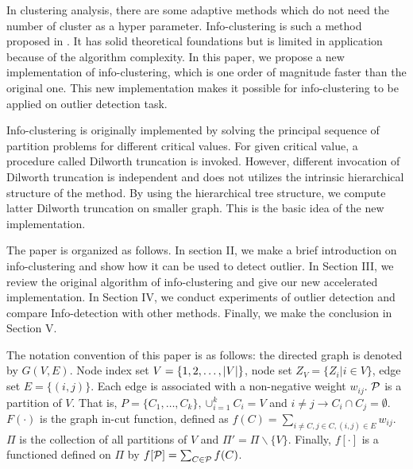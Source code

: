 \documentclass[runningheads]{llncs}
\begin{document}
In clustering analysis, there are some adaptive methods which do not need the number of cluster as a hyper parameter. Info-clustering is such a method proposed in \cite{RN1}. It has solid theoretical foundations but is limited in application because of the algorithm complexity. In this paper, we propose a new implementation of info-clustering, which is one order of magnitude faster than the original one. This new implementation makes it possible for info-clustering to be applied on outlier detection task. 

Info-clustering is originally implemented by solving the principal sequence of partition problems for different critical values. For given critical value, a procedure called Dilworth truncation is invoked. However, different invocation of Dilworth truncation is independent and does not utilizes the intrinsic hierarchical structure of the method. By using the hierarchical tree structure, we compute latter Dilworth truncation on smaller graph. This is the basic idea of the new implementation. 

The paper is organized as follows. In section II, we make a brief introduction on info-clustering and show how it can be used to detect outlier. In Section III, we review the original algorithm of info-clustering and give our new accelerated implementation. In Section IV, we conduct experiments of outlier detection and compare Info-detection with other methods. Finally, we make the conclusion in Section V.

The notation convention of this paper is as follows: the directed graph is denoted by $G(V, E)$. Node index set $V=\{1, 2,\dots, \abs{V}\}$, node set $Z_V=\{Z_i | i \in V\}$, edge set $E=\{(i, j)\}$. Each edge is associated with a non-negative weight $w_{ij}$. $\P$ is a partition of $V$. That is, $P=\{C_1, \dots, C_k\}, \cup_{i=1}^k C_i=V$ and $i\neq j \rightarrow C_i \cap C_j =\emptyset $. $F(\cdot)$ is the graph in-cut function, defined as $f(C)=\sum_{i \neq C, j\in C, (i,j) \in E} w_{ij}$. $\Pi$ is the collection of all partitions of $V$ and $\Pi'=\Pi\backslash\{V\}$. Finally, $f[\cdot]$ is a functioned defined on $\Pi$ by $f[\P]=\sum_{C\in \P}f(C)$.
\end{document}
